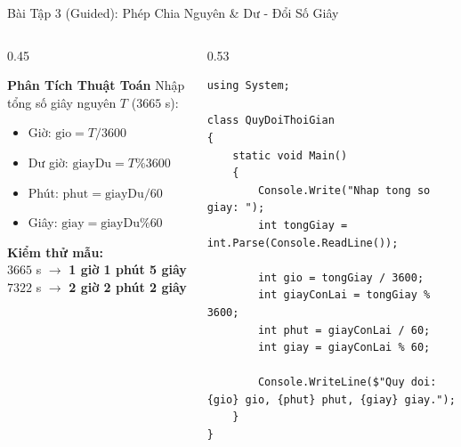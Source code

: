 \documentclass[aspectratio=169, 10pt]{beamer}
\begin{document}
\begin{frame}[fragile]{Bài Tập 3 (Guided): Phép Chia Nguyên \& Dư - Đổi Số Giây}
  \begin{columns}[T]
    \begin{column}{0.45\textwidth}
      \begin{block}{\textbf{Phân Tích Thuật Toán}}
        \small Nhập tổng số giây nguyên $T$ ($3665$ s):
        \begin{itemize}\setlength{\itemsep}{2pt}
          \item Giờ: $\text{gio} = T / 3600$
          \item Dư giờ: $\text{giayDu} = T \% 3600$
          \item Phút: $\text{phut} = \text{giayDu} / 60$
          \item Giây: $\text{giay} = \text{giayDu} \% 60$
        \end{itemize}
      \end{block}
      \begin{tcolorbox}[colback=UniLightBlue!30,colframe=UniBlue]
        \scriptsize \textbf{Kiểm thử mẫu:}\\
        $3665$ s $\to$ \textbf{1 giờ 1 phút 5 giây}\\
        $7322$ s $\to$ \textbf{2 giờ 2 phút 2 giây}
      \end{tcolorbox}
    \end{column}
    \begin{column}{0.53\textwidth}
\begin{lstlisting}
using System;

class QuyDoiThoiGian
{
    static void Main()
    {
        Console.Write("Nhap tong so giay: ");
        int tongGiay = int.Parse(Console.ReadLine());

        int gio = tongGiay / 3600;
        int giayConLai = tongGiay % 3600;
        int phut = giayConLai / 60;
        int giay = giayConLai % 60;

        Console.WriteLine($"Quy doi: {gio} gio, {phut} phut, {giay} giay.");
    }
}
\end{lstlisting}
    \end{column}
  \end{columns}
\end{frame}
\end{document}
